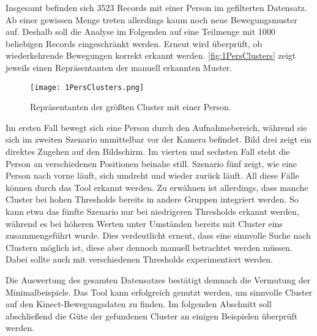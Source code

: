 Insgesamt befinden sich 3523 Records mit einer Person im gefilterten Datensatz.
Ab einer gewissen Menge treten allerdings kaum noch neue Bewegungsmuster auf.
Deshalb soll die Analyse im Folgenden auf eine Teilmenge mit 1000 beliebigen Records eingeschränkt werden.
Erneut wird überprüft, ob wiederkehrende Bewegungen korrekt erkannt werden.
\autoref{fig:1PersClusters} zeigt jeweils einen Repräsentanten der manuell erkannten Muster.
\begin{figure}[ht]
    \begin{center}
    \texttt{[image: 1PersClusters.png]}
    \end{center}
    \caption{Repräsentanten der größten Cluster mit einer Person.}
    \label{fig:1PersClusters}
\end{figure}
Im ersten Fall bewegt sich eine Person durch den Aufnahmebereich,
während sie sich im zweiten Szenario unmittelbar vor der Kamera befindet.
Bild drei zeigt ein direktes Zugehen auf den Bildschirm.
Im vierten und sechsten Fall steht die Person an verschiedenen Positionen beinahe still.
Szenario fünf zeigt, wie eine Person nach vorne läuft,
sich umdreht und wieder zurück läuft.
All diese Fälle können durch das Tool erkannt werden.
Zu erwähnen ist allerdings, dass manche Cluster bei hohen Thresholds bereits in andere Gruppen integriert werden.
So kann etwa das fünfte Szenario nur bei niedrigeren Thresholds erkannt werden,
während es bei höheren Werten unter Umständen bereits mit Cluster eins zusammengeführt wurde.
Dies verdeutlicht erneut, dass eine sinnvolle Suche nach Clustern möglich ist,
diese aber dennoch manuell betrachtet werden müssen.
Dabei sollte auch mit verschiedenen Thresholds experimentiert werden.

Die Auswertung des gesamten Datensatzes bestätigt demnach die Vermutung der Minimalbeispiele.
Das Tool kann erfolgreich genutzt werden, um sinnvolle Cluster auf den Kinect-Bewegungsdaten zu finden.
Im folgenden Abschnitt soll abschließend die Güte der gefundenen Cluster an einigen Beispielen
überprüft werden.

